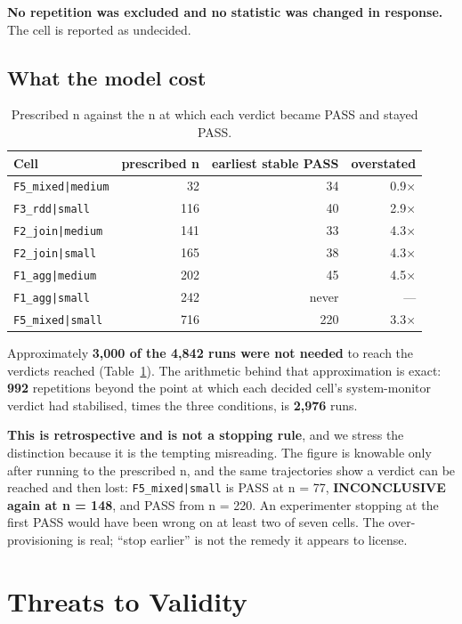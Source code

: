 \documentclass[sigconf,review,anonymous]{acmart}
\newcommand{\cell}[1]{\texttt{#1}}
\begin{document}
\textbf{No repetition was excluded and no statistic was changed in response.} The cell is reported as
undecided.

\subsection{What the model cost}\label{sec:cost}

\begin{table}[t]
\caption{Prescribed n against the n at which each verdict became PASS and stayed PASS.}\label{tab:cost}
\small
\begin{tabular}{lrrr}
\toprule
Cell & prescribed n & earliest stable PASS & overstated \\
\midrule
\cell{F5\_mixed|medium} & 32 & 34 & 0.9× \\
\cell{F3\_rdd|small} & 116 & 40 & 2.9× \\
\cell{F2\_join|medium} & 141 & 33 & 4.3× \\
\cell{F2\_join|small} & 165 & 38 & 4.3× \\
\cell{F1\_agg|medium} & 202 & 45 & 4.5× \\
\cell{F1\_agg|small} & 242 & never & --- \\
\cell{F5\_mixed|small} & 716 & 220 & 3.3× \\
\bottomrule
\end{tabular}
\end{table}

Approximately \textbf{3,000 of the 4,842 runs were not needed} to reach the verdicts reached
(Table~\ref{tab:cost}). The arithmetic behind that approximation is exact: \textbf{992} repetitions
beyond the point at which each decided cell's system-monitor verdict had stabilised, times the three
conditions, is \textbf{2,976} runs.

\textbf{This is retrospective and is not a stopping rule}, and we stress the distinction because it
is the tempting misreading. The figure is knowable only after running to the prescribed n, and
the same trajectories show a verdict can be reached and then lost: \cell{F5\_mixed|small} is PASS at
n = 77, \textbf{INCONCLUSIVE again at n = 148}, and PASS from n = 220. An experimenter stopping at the
first PASS would have been wrong on at least two of seven cells. The over-provisioning is real;
``stop earlier'' is not the remedy it appears to license.

\section{Threats to Validity}
\end{document}
